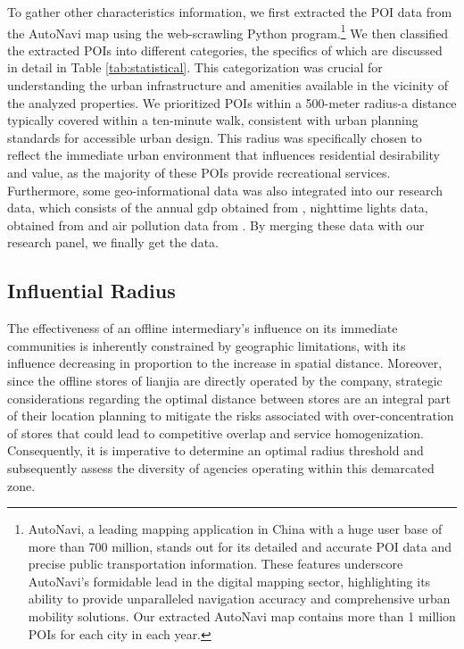 \documentclass[12pt]{article}
\begin{document}
To gather other characteristics information, we first extracted the POI data from the AutoNavi map using the web-scrawling Python program.\footnote{AutoNavi, a leading mapping application in China with a huge user base of more than 700 million, stands out for its detailed and accurate POI data and precise public transportation information. These features underscore AutoNavi's formidable lead in the digital mapping sector, highlighting its ability to provide unparalleled navigation accuracy and comprehensive urban mobility solutions. Our extracted AutoNavi map contains more than 1 million POIs for each city in each year.} We then classified the extracted POIs into different categories, the specifics of which are discussed in detail in Table \ref{tab:statistical}. This categorization was crucial for understanding the urban infrastructure and amenities available in the vicinity of the analyzed properties. We prioritized POIs within a 500-meter radius-a distance typically covered within a ten-minute walk, consistent with urban planning standards for accessible urban design. This radius was specifically chosen to reflect the immediate urban environment that influences residential desirability and value, as the majority of these POIs provide recreational services. Furthermore, some geo-informational data was also integrated into our research data, which consists of the annual gdp obtained from \citep{zhao_forecasting_2017}, nighttime lights data, obtained from \citep{elvidge_annual_2021} and air pollution data from \citep{doi:10.1021/acs.est.1c05309}. By merging these data with our research panel, we finally get the data.


\subsection{Influential Radius} \label{subsec:Influential_Radius}

The effectiveness of an offline intermediary's influence on its immediate communities is inherently constrained by geographic limitations, with its influence decreasing in proportion to the increase in spatial distance. Moreover, since the offline stores of lianjia are directly operated by the company, strategic considerations regarding the optimal distance between stores are an integral part of their location planning to mitigate the risks associated with over-concentration of stores that could lead to competitive overlap and service homogenization. Consequently, it is imperative to determine an optimal radius threshold and subsequently assess the diversity of agencies operating within this demarcated zone.
\end{document}

